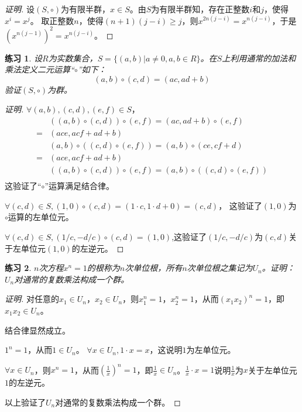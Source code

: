 \documentclass{article}
\newtheorem{Exercise}{练习}
\begin{document}
\begin{CJK*}{UTF8}{gbsn}
\begin{proof}[证明]
  设$(S,\circ)$为有限半群，$x\in S$。由$S$为有限半群知，存在正整数$i$和$j$，使得$x^i=x^j$。
  取正整数$n$，使得$(n+1)(j-i)\geq j$，则$x^{2n(j-i)}=x^{n(j-i)}$，于是$(x^{n(j-1)})^2=x^{n(j-i)}$。
\end{proof}
\begin{Exercise}
  设$R$为实数集合，$S=\{(a,b)|a\neq 0,a,b\in R\}$。在$S$上利用通常的加法和乘法定义二元运算“$\circ$”如下：
  \[(a,b)\circ (c,d) = (ac, ad + b)\]
  验证$(S,\circ)$为群。
\end{Exercise}
\begin{proof}[证明]
  $\forall (a,b),(c,d),(e,f)\in S$，
  \begin{align*}
    &((a,b)\circ (c,d))\circ (e,f) = (ac,ad+b)\circ (e,f)\\
    =&(ace,acf+ad+b)\\
    &(a,b)\circ ((c,d)\circ (e,f)) = (a,b)\circ (ce,cf+d)\\
    =&(ace,acf+ad+b)\\
    &((a,b)\circ (c,d))\circ (e,f) = (a,b)\circ ((c,d)\circ (e,f))\\
  \end{align*}
  这验证了“$\circ$”运算满足结合律。

  $\forall (c,d)\in S, (1,0)\circ (c,d) = (1\cdot c, 1\cdot d + 0) = (c,d)$，
这验证了$(1,0)$为$\circ$运算的左单位元。

$\forall (c,d)\in S,(1/c,-d/c)\circ (c,d) = (1,0)$,这验证了$(1/c,-d/c)$为$(c,d)$关于左单位元$(1,0)$的左逆元。
\end{proof}
\begin{Exercise}
  $n$次方程$x^n=1$的根称为$n$次单位根，所有$n$次单位根之集记为$U_n$。证明：$U_n$对通常的复数乘法构成一个群。
\end{Exercise}
\begin{proof}[证明]
  对任意的$x_1\in U_n$，$x_2\in U_n$，则$x^n_1=1$，$x_2^n=1$，从而$(x_1x_2)^n=1$，即$x_1x_2\in U_n$。

  结合律显然成立。

  $1^n=1$，从而$1\in U_n$。 $\forall x\in U_n, 1\cdot x = x$，这说明$1$为左单位元。

  $\forall x\in U_n$，则$x^n=1$，从而$(\frac{1}{x})^n=1$，即$\frac{1}{x}\in U_n$。$\frac{1}{x}\cdot x =1$说明$\frac{1}{x}$为$x$关于左单位元$1$的左逆元。

  以上验证了$U_n$对通常的复数乘法构成一个群。
\end{proof}


\end{CJK*}
\end{document}
